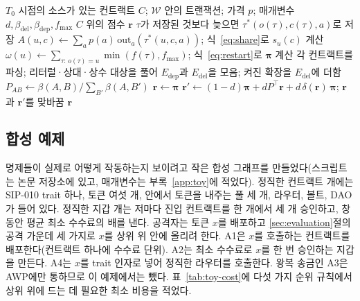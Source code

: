 \begin{algorithm}[htbp]
\caption{\PCER}
\label{alg:pcer}
\begin{algorithmic}[1]
\Require $T_0$ 시점의 소스가 있는 컨트랙트 $C$; $\mathcal{W}$ 안의 트랜잭션; 가격 $p$; 매개변수 $d,\beta_{\mathrm{del}},\beta_{\mathrm{dep}},f_{\max}$
\Ensure $C$ 위의 점수 $\mathbf{r}$
  \State $\tau$가 저장된 것보다 늦으면 $\tau^{*}(o(\tau),c(\tau),a)$로 저장
\EndFor
\State $A(u,c)\gets\sum_a p(a)\,\mathrm{out}_a(\tau^{*}(u,c,a))$; 식~\eqref{eq:share}로 $s_u(c)$ 계산
\State $\omega(u)\gets\sum_{\tau:\,o(\tau)=u}\min(f(\tau),f_{\max})$; 식~\eqref{eq:restart}로 $\boldsymbol{\pi}$ 계산
\State 각 컨트랙트를 파싱; 리터럴·상대·상수 대상을 풀어 $E_{\mathrm{dep}}$과 $E_{\mathrm{del}}$을 모음; 켜진 확장을 $E_{\mathrm{del}}$에 더함
\State $P_{AB}\gets\beta(A,B)/\sum_{B'}\beta(A,B')$
\State $\mathbf{r}\gets\boldsymbol{\pi}$
\Repeat
  \State $\mathbf{r}'\gets(1-d)\boldsymbol{\pi}+dP^{\top}\mathbf{r}+d\,\delta(\mathbf{r})\,\boldsymbol{\pi}$; $\mathbf{r}$과 $\mathbf{r}'$를 맞바꿈
\State \Return $\mathbf{r}$
\end{algorithmic}
\end{algorithm}

\subsection{합성 예제}
\label{sec:method-toy}

명제들이 실제로 어떻게 작동하는지 보이려고 작은 합성 그래프를 만들었다(스크립트는 논문 저장소에 있고, 매개변수는 부록~\ref{app:toy}에 적었다). 정직한 컨트랙트 \ToyContracts 개에는 SIP-010 trait 하나, 토큰 여섯 개,  안에서 토큰을 내주는 풀 세 개, 라우터, 볼트, DAO가 들어 있다. 정직한 지갑 \ToyWallets 개는 저마다 진입 컨트랙트를 한 개에서 세 개 승인하고, 창 동안 평균 최소 수수료의 \ToyMeanFee 배를 낸다. 공격자는 토큰 $x$를 배포하고 \ref{sec:evaluation}절의 공격 가운데 세 가지로 $x$를 상위 \ToyTop 위 안에 올리려 한다. A1은 $x$를 호출하는 컨트랙트를 배포한다(컨트랙트 하나에 수수료 \ToyDeployFee 단위). A2는 최소 수수료로 $x$를 한 번 승인하는 지갑을 만든다. A4는 $x$를 trait 인자로 넣어 정직한 라우터를 호출한다. 왕복 송금인 A3은 AWP에만 통하므로 이 예제에서는 뺐다. 표~\ref{tab:toy-cost}에 다섯 가지 순위 규칙에서 상위 \ToyTop 위에 드는 데 필요한 최소 비용을 적었다.

\begin{table}[htbp]
\centering
\caption{정직한 컨트랙트 \ToyContracts 개로 된 합성 그래프에서 공격자 토큰을 상위 \ToyTop 위 안에 올리는 최소 공격 비용(최소 호출 수수료 단위). 공격 크기는 두 배씩 늘려 시험한 뒤 이분 탐색으로 좁히며, 공격이 커져도 토큰의 순위가 내려가지 않는다고 가정한다. 동점은 토큰에 유리하게 센다. ``도달 못 함''은 공격 크기가 200,000일 때도 토큰이 상위 \ToyTop 위 밖에 있다는 뜻이다. 그래프는 꾸며 낸 것이며, 이 표는 명제~\ref{prop:bipartite}--\ref{prop:region}를 예시할 뿐 Stacks 메인넷에 대한 결과가 아니다.}
\label{tab:toy-cost}
\small

\end{table}


